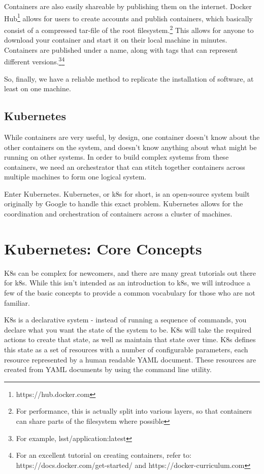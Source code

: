 \documentclass[11pt,twoside]{article}
\begin{document}
Containers are also easily shareable by publishing them on the internet.  Docker Hub\footnote{https://hub.docker.com}
allows for users to create accounts and publish containers, which basically consist of
a compressed tar-file of the root filesystem.\footnote{For performance, this is actually split into
various layers, so that containers can share parts of the filesystem where possible} This allows for
anyone to download your container and start it on their local machine in minutes.  Containers are published under
a name, along with tags that can represent different versions.\footnote{For example, lsst/application:latest}\footnote{
For an excellent tutorial on creating containers, refer to: https://docs.docker.com/get-started/
and https://docker-curriculum.com}

So, finally, we have a reliable method to replicate the installation of software,
at least on one machine.

\subsection{Kubernetes}

While containers are very useful, by design, one container doesn't know about the other containers
on the system, and doesn't know anything about what might be running on other systems.
In order to build complex systems from these containers, we need an orchestrator that
can stitch together containers across multiple machines to form one logical system.

Enter Kubernetes.
Kubernetes, or k8s for short, is an open-source system built originally by Google to handle this exact
problem.  Kubernetes allows for the coordination and orchestration of containers across
a cluster of machines.

\section{Kubernetes: Core Concepts}

K8s can be complex for newcomers, and there are many great tutorials out there
for k8s.  While this isn't intended as an introduction to k8s, we will
introduce a few of the basic concepts to provide a common vocabulary for
those who are not familiar.

K8s is a declarative system - instead of running
a sequence of commands, you declare what you want the state of the system to be.
K8s will take the required actions to create that state, as well as maintain
that state over time.  K8s defines this state as a set of resources with a number of
configurable parameters, each resource represented by a human readable YAML document.
These resources are created from YAML documents by using the  command line utility.
\end{document}
